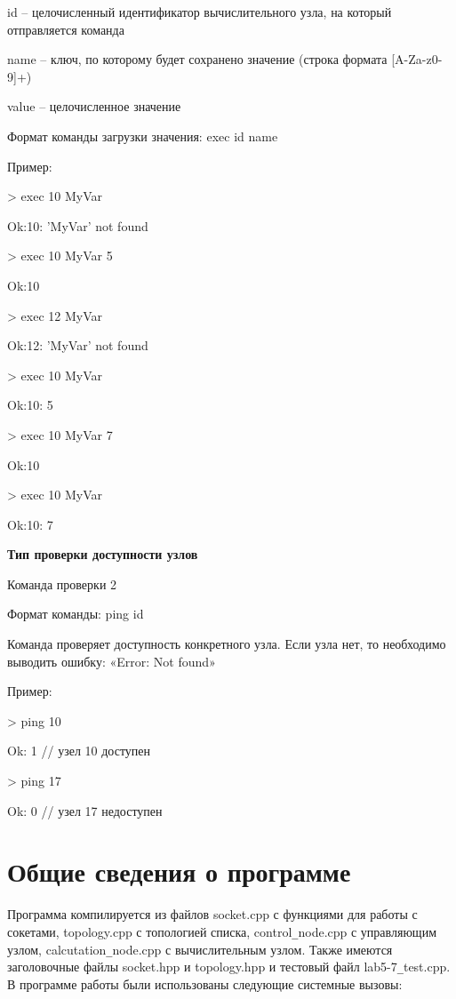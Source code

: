\documentclass[a4paper, 14pt]{article}
\begin{document}
id – целочисленный идентификатор вычислительного узла, на который отправляется команда

name – ключ, по которому будет сохранено значение (строка формата [A-Za-z0-9]+)

value – целочисленное значение

Формат команды загрузки значения: exec id name

Пример:

> exec 10 MyVar

Ok:10: 'MyVar' not found

> exec 10 MyVar 5

Ok:10

> exec 12 MyVar

Ok:12: 'MyVar' not found

> exec 10 MyVar

Ok:10: 5

> exec 10 MyVar 7

Ok:10

> exec 10 MyVar

Ok:10: 7
\newpage

\textbf{Тип проверки доступности узлов}

Команда проверки 2

Формат команды: ping id

Команда проверяет доступность конкретного узла. Если узла нет, то необходимо выводить ошибку: «Error: Not found» 

Пример:

> ping 10

Ok: 1 // узел 10 доступен

> ping 17

Ok: 0 // узел 17 недоступен

\section*{Общие сведения о программе}
Программа компилируется из файлов socket.cpp с функциями для работы с сокетами, topology.cpp с топологией списка, control\texttt{\_}node.cpp с управляющим узлом, calcutation\texttt{\_}node.cpp с вычислительным узлом. Также имеются заголовочные файлы socket.hpp и topology.hpp и тестовый файл lab5-7\texttt{\_}test.cpp. В программе работы были использованы следующие системные вызовы:
\end{document}
